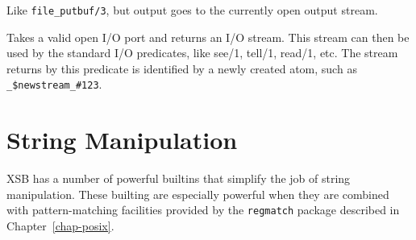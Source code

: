 \begin{description}
Like \verb|file_putbuf/3|, but output goes to the currently open output stream.

Takes a valid open I/O port and returns an I/O stream. This stream can then
be used by the standard I/O predicates, like see/1, tell/1, read/1, etc.
The stream returns by this predicate is identified by a newly created atom,
such as \verb|_$newstream_#123|. 


\end{description}

\section{String Manipulation}
\label{sec-strings}

        XSB has a number of powerful builtins that simplify the job of string
manipulation. These builting are especially powerful when they are combined
with pattern-matching facilities provided by the {\tt regmatch} package
described in Chapter~\ref{chap-posix}.

